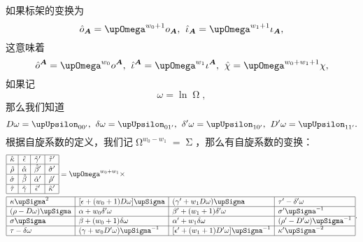 如果标架的变换为
\begin{equation*}
	\hat{o}_{\boldsymbol{A}} =\upOmega^{w_{0} +1} o_{\boldsymbol{A}} ,\kern+0.4em \hat{\iota }_{\boldsymbol{A}} =\upOmega^{w_{1} +1} \iota _{\boldsymbol{A}} ,
\end{equation*}
这意味着
\begin{equation*}
	\hat{o}^{\boldsymbol{A}} =\upOmega^{w_{0}} o^{\boldsymbol{A}} ,\kern+0.4em \hat{\iota }^{\boldsymbol{A}} =\upOmega^{w_{1}} \iota ^{\boldsymbol{A}} ,\kern+0.4em \hat{\chi } =\upOmega^{w_{0} +w_{1} +1} \chi ,
\end{equation*}
如果记
\begin{equation*}
	\omega =\ln \upOmega,
\end{equation*}
那么我们知道
\begin{equation*}
	D\omega =\upUpsilon _{00'} ,\kern+0.4em \delta \omega =\upUpsilon _{01'} ,\kern+0.4em \delta '\omega =\upUpsilon _{10'} ,\kern+0.4em D'\omega =\upUpsilon _{11'} .
\end{equation*}
根据自旋系数的定义，我们记$\upOmega^{w_{0} -w_{1}} =\upSigma $，那么有自旋系数的变换：
\begin{equation*}
	\begin{aligned}
		& \begin{array}{|c|c|c|c|}
			\hline
			\hat{\kappa } & \hat{\epsilon } & \hat{\gamma } ' & \hat{\tau } '\\
			\hline
			\hat{\rho } & \hat{\alpha } & \hat{\beta } ' & \hat{\sigma } '\\
			\hline
			\hat{\sigma } & \hat{\beta } & \hat{\alpha } ' & \hat{\rho } '\\
			\hline
			\hat{\tau } & \hat{\gamma } & \hat{\epsilon } ' & \hat{\kappa } '\\
			\hline
		\end{array} =\upOmega^{w_{0} +w_{1}} \times \\
		& \begin{array}{|l|l|l|l|}
			\hline
			\kappa \upSigma ^{2} & [ \epsilon +( w_{0} +1) D\omega ] \upSigma  & ( \gamma '+w_{1} D\omega ) \upSigma  & \tau '-\delta '\omega \\
			\hline
			(\rho -D\omega )\upSigma  & \alpha +w_{0} \delta '\omega  & \beta '+( w_{1} +1) \delta '\omega  & \sigma '\upSigma ^{-1}\\
			\hline
			\sigma \upSigma  & \beta +( w_{0} +1) \delta \omega  & \alpha '+w_{1} \delta \omega  & ( \rho '-D'\omega ) \upSigma ^{-1}\\
			\hline
			\tau -\delta \omega  & ( \gamma +w_{0} D'\omega ) \upSigma ^{-1} & [ \epsilon '+( w_{1} +1) D'\omega ] \upSigma ^{-1} & \kappa '\upSigma ^{-2}\\
			\hline
		\end{array} .
	\end{aligned}
\end{equation*}

